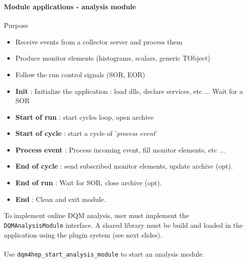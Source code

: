 \documentclass[8pt]{beamer}
\begin{document}
  
  \begin{frame}[containsverbatim]
    \frametitle{\secname}
    \framesubtitle{Module applications - analysis module}
    
    \begin{minipage}{0.78\textwidth}
      \begin{block}{Purpose}
        \begin{itemize}
          \item Receive events from a collector server and process them
          \item Produce monitor elements (histograms, scalars, generic TObject)
          \item Follow the run control signals (SOR, EOR)
        \end{itemize}
      \end{block}
              
      \begin{itemize}
        \item \textbf{Init} : Initialize the application : load dlls, declare services, etc ... Wait for a SOR
        \item \textbf{Start of run} : start cycles loop, open archive
        \item \textbf{Start of cycle} : start a cycle of '\textit{process event}'
        \item \textbf{Process event} : Process incoming event, fill monitor elements, etc ...
        \item \textbf{End of cycle} : send subscribed monitor elements, update archive (opt). 
        \item \textbf{End of run} : Wait for SOR, close archive (opt).
        \item \textbf{End} : Clean and exit module.
      \end{itemize}
      To implement online DQM analysis, user must implement the \verb|DQMAnalysisModule| interface. A shared library must be build and loaded in the application using the plugin system (see next slides). \\
      ~ \\
      Use \verb|dqm4hep_start_analysis_module| to start an analysis module.
        

\end{minipage}
\end{frame}
\end{document}
